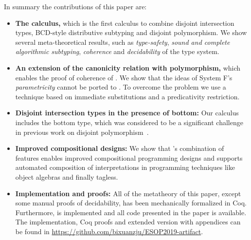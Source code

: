 \begin{comment}
Besides coherence, we show
several other important meta-theoretical results, such as type-safety, 
sound and complete algorithmic subtyping, and
decidability of the type system. Remarkably, unlike 
\fsub's \emph{bounded polymorphism}, disjoint polymorphism
in \fnamee supports decidable type-checking.
\end{comment}

In summary the contributions of this paper are:
\begin{itemize}

\item {\bf The \fnamee calculus,} which is the first calculus to combine 
disjoint intersection types, BCD-style distributive subtyping and 
disjoint polymorphism. 
   We show several meta-theoretical results, such as \emph{type-safety}, 
\emph{sound and complete algorithmic subtyping}, \emph{coherence} and
\emph{decidability} of the type system.

\item {\bf An extension of the canonicity relation with polymorphism,} which enables the proof
    of coherence of \fnamee. We show that the ideas of
  System F's \emph{parametricity} cannot be ported to
  \fnamee. To overcome the problem we use a technique based on
  immediate substitutions and a predicativity restriction.

\item {\bf Disjoint intersection types in the presence of bottom:}
  Our calculus includes the bottom type, which was considered to be a
significant challenge in previous work on disjoint polymorphism~\cite{alpuimdisjoint}.

\item {\bf Improved compositional designs:} We show that \fnamee's combination of features
enables improved
compositional programming designs and supports automated composition
of interpretations in programming techniques like object algebras and
finally tagless.

\item {\bf Implementation and proofs:} All of the metatheory
  of this paper, except some manual proofs of decidability, has been
  mechanically formalized in Coq. Furthermore, \fnamee is
  implemented and all code presented in the paper is available. The
  implementation, Coq proofs and extended version with appendices can be found in
  \url{https://github.com/bixuanzju/ESOP2019-artifact}.

\end{itemize}

